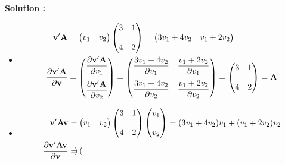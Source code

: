 \documentclass[letter, 11pt]{article}
\newcommand{\prof}[1]{\ifdefined\avecsolutions\par{\color{blue}\textbf{Solution :} #1}\par\fi}
\begin{document}
\begin{enumerate}[leftmargin=*, wide, label=\bf Exercice \arabic*:]
\prof{ 
    \begin{itemize}
    \item[(a)]  
    \begin{align*}
        \bf{v'A}
        &= \begin{pmatrix}
            v_1 & v_2
        \end{pmatrix}
        \begin{pmatrix}
            3 & 1 \\[4mm]
            4 & 2
        \end{pmatrix}
        = \begin{pmatrix}
            3v_1 + 4v_2 & v_1 + 2v_2
        \end{pmatrix}\\
        \dfrac{\partial \bf{v'A}}{\partial \bf{v}}
        &= \begin{pmatrix}
            \dfrac{\partial \bf{v'A}}{\partial v_1} \\[4mm]
            \dfrac{\partial \bf{v'A}}{\partial v_2}
        \end{pmatrix}
        = \begin{pmatrix}
            \dfrac{ 3v_1 + 4v_2}{\partial v_1} & \dfrac{ v_1 + 2v_2}{\partial v_1} \\[4mm]
            \dfrac{ 3v_1 + 4v_2}{\partial v_2} & \dfrac{ v_1 + 2v_2}{\partial v_2} 
        \end{pmatrix}
        = \begin{pmatrix}
            3 & 1 \\[4mm]
            4 & 2
        \end{pmatrix}
        = \bold A
    \end{align*}
    \item[(b)] \begin{align*}
        \bf{v'Av}
        &= \begin{pmatrix}
            v_1 & v_2
        \end{pmatrix}
        \begin{pmatrix}
            3 & 1 \\[4mm]
            4 & 2
        \end{pmatrix}
        \begin{pmatrix}
            v_1 \\[4mm] v_2
        \end{pmatrix}
        = (3v_1 + 4v_2)v_1 + (v_1 + 2v_2)v_2\\
        \dfrac{\partial \bf{v'Av}}{\partial \bf{v}}
        &= \begin{pmatrix}

\end{pmatrix}
\end{align*}
\end{itemize}}
\end{enumerate}
\end{document}
